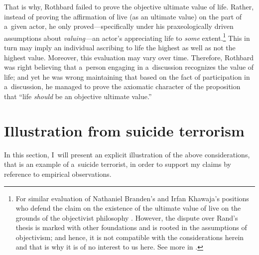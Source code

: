 That is why, Rothbard failed to prove the objective ultimate value of life. Rather, instead of proving the affirmation of live (as an ultimate value) on the part of a~given actor, he only proved---specifically under his praxeologically driven assumptions about \textit{valuing---}an actor's appreciating life to \textit{some} extent.\footnote{For similar evaluation of Nathaniel Branden's and Irfan Khawaja's positions who defend the claim on the existence of the ultimate value of live on the grounds of the objectivist philosophy 
\parencite[see][pp.97–98]{}. %
 However, the dispute over Rand's thesis is marked with other foundations and is rooted in the assumptions of objectivism; and hence, it is not compatible with the considerations herein and that is why it is of no interest to us here. See more in 
\parencites[][]{}[][pp.69–86]{}[][pp.54–67]{}.%
} This in turn may imply an individual ascribing to life the highest as well as not the highest value. Moreover, this evaluation may vary over time. Therefore, Rothbard was right believing that a~person engaging in a~discussion recognizes the value of life; and yet he was wrong maintaining that based on the fact of participation in a~discussion, he managed to prove the axiomatic character of the proposition that ``life \textit{should} be an objective ultimate value.''



\section{Illustration from suicide terrorism}

In this section, I~will present an explicit illustration of the above considerations, that is an example of a~suicide terrorist, in order to support my claims by reference to empirical observations.



